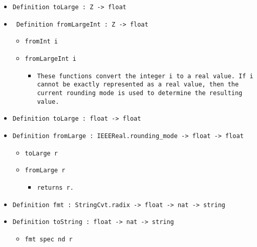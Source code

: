 \documentclass[11pt]{report}
\begin{document}
\begin{itemize}
\item  \texttt{Definition toLarge : Z -> float}

\item \texttt{ Definition fromLargeInt :  Z -> float}

\begin{itemize}
\item  \texttt{fromInt i }

\item  \texttt{fromLargeInt i}

\begin{itemize}
\item  \begin{flushleft} \texttt{These functions convert the integer i to a real value. If i cannot be exactly represented as a real value, then the current rounding mode is used to determine the resulting value.} \end{flushleft} 



\end{itemize}

\end{itemize}

\item  \texttt{Definition toLarge : float -> float}

\item  \texttt{Definition fromLarge : IEEEReal.rounding\_mode -> float -> float}

\begin{itemize}
\item  \texttt{toLarge r}

\item  \texttt{fromLarge r}

\begin{itemize}
\item  \texttt{returns r.}



\end{itemize}

\end{itemize}

\item  \texttt{Definition fmt : StringCvt.radix -> float -> nat -> string}

\item  \texttt{Definition toString :  float -> nat -> string}

\begin{itemize}
\item  \texttt{fmt spec nd r}


\end{itemize}
\end{itemize}
\end{document}
